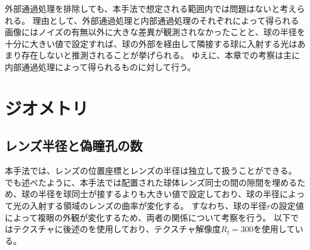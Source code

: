外部通過処理を排除しても、本手法で想定される範囲内では問題はないと考えられる。
理由として、外部通過処理と内部通過処理のそれぞれによって得られる画像にはノイズの有無以外に大きな差異が観測されなかったことと、球の半径を十分に大きい値で設定すれば、球の外部を経由して隣接する球に入射する光はあまり存在しないと推測されることが挙げられる。
ゆえに、本章での考察は主に内部通過処理によって得られるものに対して行う。


\section{ジオメトリ}
\label{S}

\subsection{レンズ半径と偽瞳孔の数}
\label{SS}

本手法では、レンズの位置座標とレンズの半径は独立して扱うことができる。
でも述べたように、本手法では配置された球体レンズ同士の間の隙間を埋めるため、球の半径を球同士が接するよりも大きい値で設定しており、球の半径によって光の入射する領域のレンズの曲率が変化する。
すなわち、球の半径$r$の設定値によって複眼の外観が変化するため、両者の関係について考察を行う。
以下ではテクスチャに後述のを使用しており、テクスチャ解像度$R_t = 300$を使用している。

